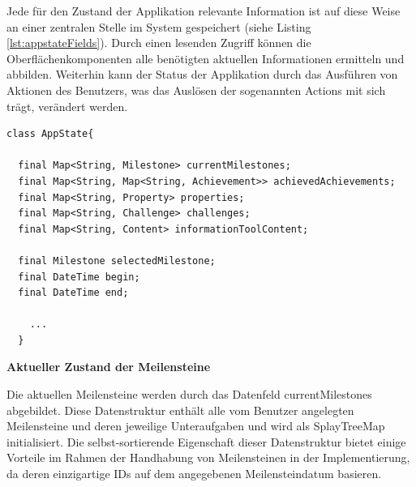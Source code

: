 \documentclass[bibliography=totoc,listof=totoc,BCOR=5mm,DIV=12,oneside]{scrbook}
\begin{document}
\par \medskip Jede für den Zustand der Applikation relevante Information ist auf diese Weise an einer zentralen Stelle im System gespeichert (siehe Listing \ref{lst:appstateFields}). Durch einen lesenden Zugriff können die Oberflächenkomponenten alle benötigten aktuellen Informationen ermitteln und abbilden. Weiterhin kann der Status der Applikation durch das Ausführen von Aktionen des Benutzers, was das Auslösen der sogenannten Actions mit sich trägt, verändert werden.
  
  \bigskip
 \begin{lstlisting}[caption={Datenfelder der AppState-Klasse},captionpos=b, label=lst:appstateFields]
class AppState{

  final Map<String, Milestone> currentMilestones;
  final Map<String, Map<String, Achievement>> achievedAchievements;
  final Map<String, Property> properties;
  final Map<String, Challenge> challenges;
  final Map<String, Content> informationToolContent; 
 
  final Milestone selectedMilestone;
  final DateTime begin;
  final DateTime end;

	...
  }
\end{lstlisting}
\bigskip



\par \bigskip \textbf{Aktueller Zustand der Meilensteine}
\par Die aktuellen Meilensteine werden durch das Datenfeld currentMilestones abgebildet. Diese Datenstruktur enthält alle vom Benutzer angelegten Meilensteine und deren jeweilige Unteraufgaben und wird als SplayTreeMap initialisiert. Die selbst-sortierende Eigenschaft dieser Datenstruktur bietet einige Vorteile im Rahmen der Handhabung von Meilensteinen in der Implementierung, da deren einzigartige IDs auf dem angegebenen Meilensteindatum basieren.
\end{document}
